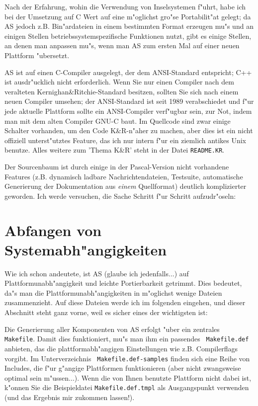 \documentclass[12pt,a4paper,twoside]{report}
\newcommand{\asname}{AS}
\begin{document}
Nach der Erfahrung, wohin die Verwendung von Inselsystemen f"uhrt, habe
ich bei der Umsetzung auf C Wert auf eine m"oglichst gro"se Portabilit"at
gelegt; da \asname{} jedoch z.B. Bin"ardateien in einem bestimmten Format
erzeugen mu"s und an einigen Stellen betriebssystemspezifische Funktionen
nutzt, gibt es einige Stellen, an denen man anpassen mu"s, wenn man \asname{} zum
ersten Mal auf einer neuen Plattform "ubersetzt.

\asname{} ist auf einen C-Compiler ausgelegt, der dem ANSI-Standard entspricht;
C++ ist ausdr"ucklich nicht erforderlich.  Wenn Sie nur einen Compiler
nach dem veralteten Kernighan\&Ritchie-Standard besitzen, sollten Sie sich
nach einem neuen Compiler umsehen; der ANSI-Standard ist seit 1989
verabschiedet und f"ur jede aktuelle Plattform sollte ein ANSI-Compiler
verf"ugbar sein, zur Not, indem man mit dem alten Compiler GNU-C baut.  Im
Quellcode sind zwar einige Schalter vorhanden, um den Code K\&R-n"aher zu
machen, aber dies ist ein nicht offiziell unterst"utztes Feature, das ich
nur intern f"ur ein ziemlich antikes Unix benutze.  Alles weitere zum
'Thema K\&R' steht in der Datei {\tt README.KR}.

Der Sourcenbaum ist durch einige in der Pascal-Version nicht vorhandene
Features (z.B. dynamisch ladbare Nachrichtendateien, Testsuite,
automatische Generierung der Dokumentation aus {\em einem} Quellformat)
deutlich komplizierter geworden.  Ich werde versuchen, die Sache Schritt
f"ur Schritt aufzudr"oseln:


\section{Abfangen von Systemabh"angigkeiten}

Wie ich schon andeutete, ist \asname{} (glaube ich jedenfalls...) auf
Plattformunabh"angigkeit und leichte Portierbarkeit getrimmt.  Dies
bedeutet, da"s man die Platt\-form\-un\-ab\-h"an\-gig\-kei\-ten in
m"oglichst wenige Dateien zusammenzieht.  Auf diese Dateien werde ich im
folgenden eingehen, und dieser Abschnitt steht ganz vorne, weil es sicher
eines der wichtigsten ist:

Die Generierung aller Komponenten von \asname{} erfolgt "uber ein zentrales {\tt
Makefile}.  Damit dies funktioniert, mu"s man ihm ein passendes {\tt
Makefile.def} anbieten, das die plattformabh"angigen Einstellungen wie
z.B. Compilerflags vorgibt.  Im Unterverzeichnis {\tt
Makefile.def-samples} finden sich eine Reihe von Includes, die f"ur
g"angige Plattformen funktionieren (aber nicht zwangsweise optimal sein
m"ussen...).  Wenn die von Ihnen benutzte Plattform nicht dabei ist,
k"onnen Sie die Beispieldatei {\tt Makefile.def.tmpl} als Ausgangspunkt
verwenden (und das Ergebnis mir zukommen lassen!).
\end{document}
